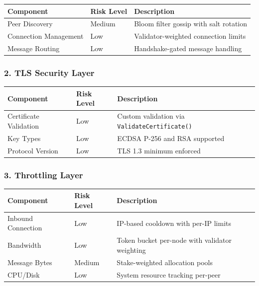 \documentclass[
]{article}
\newcounter{none} %
\begin{document}
{\def\LTcaptype{none} %
\begin{longtable}[]{@{}lll@{}}
\toprule\noalign{}
Component & Risk Level & Description \\
\midrule\noalign{}
\endhead
\bottomrule\noalign{}
\endlastfoot
Peer Discovery & Medium & Bloom filter gossip with salt rotation \\
Connection Management & Low & Validator-weighted connection limits \\
Message Routing & Low & Handshake-gated message handling \\
\end{longtable}
}

\subsubsection{2. TLS Security Layer}\label{2-tls-security-layer}

{\def\LTcaptype{none} %
\begin{longtable}[]{@{}lll@{}}
\toprule\noalign{}
Component & Risk Level & Description \\
\midrule\noalign{}
\endhead
\bottomrule\noalign{}
\endlastfoot
Certificate Validation & Low & Custom validation via
\texttt{ValidateCertificate()} \\
Key Types & Low & ECDSA P-256 and RSA supported \\
Protocol Version & Low & TLS 1.3 minimum enforced \\
\end{longtable}
}

\subsubsection{3. Throttling Layer}\label{3-throttling-layer}

{\def\LTcaptype{none} %
\begin{longtable}[]{@{}lll@{}}
\toprule\noalign{}
Component & Risk Level & Description \\
\midrule\noalign{}
\endhead
\bottomrule\noalign{}
\endlastfoot
Inbound Connection & Low & IP-based cooldown with per-IP limits \\
Bandwidth & Low & Token bucket per-node with validator weighting \\
Message Bytes & Medium & Stake-weighted allocation pools \\
CPU/Disk & Low & System resource tracking per-peer \\
\end{longtable}
}
\end{document}
